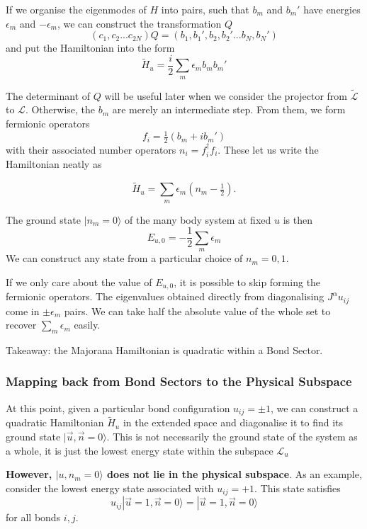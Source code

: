 If we organise the eigenmodes of \(H\) into pairs, such that \(b_m\) and \(b_m'\) have energies \(\epsilon_m\) and \(-\epsilon_m\), we can construct the transformation \(Q\) \[(c_1, c_2... c_{2N}) Q = (b_1, b_1', b_2, b_2' ... b_{N}, b_{N}')\] and put the Hamiltonian into the form \[\tilde{H}_u = \frac{i}{2} \sum_m \epsilon_m b_m b_m'\]

The determinant of \(Q\) will be useful later when we consider the projector from \(\mathcal{\tilde{L}}\) to \(\mathcal{L}\). Otherwise, the \(b_m\) are merely an intermediate step. From them, we form fermionic operators \[ f_i = \tfrac{1}{2} (b_m + ib_m')\] with their associated number operators \(n_i = f^\dagger_i f_i\). These let us write the Hamiltonian neatly as

\[ \tilde{H}_u = \sum_m \epsilon_m (n_m - \tfrac{1}{2}).\]

The ground state \(|n_m = 0\rangle\) of the many body system at fixed \(u\) is then \[E_{u,0} = -\frac{1}{2}\sum_m \epsilon_m \] We can construct any state from a particular choice of \(n_m = 0,1\).

If we only care about the value of \(E_{u,0}\), it is possible to skip forming the fermionic operators. The eigenvalues obtained directly from diagonalising \(J^{\alpha} u_{ij}\) come in \(\pm \epsilon_m\) pairs. We can take half the absolute value of the whole set to recover \(\sum_m \epsilon_m\) easily.

Takeaway: the Majorana Hamiltonian is quadratic within a Bond Sector.

\hypertarget{mapping-back-from-bond-sectors-to-the-physical-subspace}{%
\subsubsection{Mapping back from Bond Sectors to the Physical Subspace}\label{mapping-back-from-bond-sectors-to-the-physical-subspace}}

At this point, given a particular bond configuration \(u_{ij} = \pm 1\), we can construct a quadratic Hamiltonian \(\tilde{H}_u\) in the extended space and diagonalise it to find its ground state \(|\vec{u}, \vec{n} = 0\rangle\). This is not necessarily the ground state of the system as a whole, it is just the lowest energy state within the subspace \(\mathcal{L}_u\)

\textbf{However, \(|u, n_m = 0\rangle\) does not lie in the physical subspace}. As an example, consider the lowest energy state associated with \(u_{ij} = +1\). This state satisfies \[u_{ij} |\vec{u}=1, \vec{n} = 0\rangle = |\vec{u}=1, \vec{n} = 0\rangle\] for all bonds \(i,j\).


